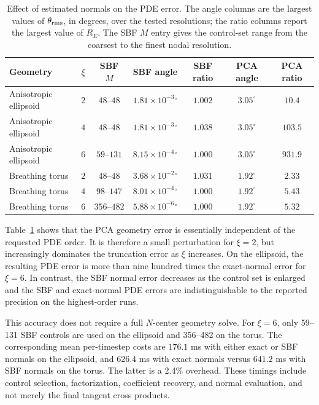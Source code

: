 \documentclass[a4paper,fleqn]{cas-sc}
\begin{document}
\begin{table}[!htbp]
\centering
\caption{Effect of estimated normals on the PDE error.  The angle columns are
the largest values of \(\theta_{\rm rms}\), in degrees, over the tested
resolutions; the ratio columns report the largest value of \(R_E\).  The SBF
\(M\) entry gives the control-set range from the coarsest to the finest nodal
resolution.}
\scriptsize
\setlength{\tabcolsep}{3pt}
\label{tab:final-normal-source-accuracy}
\begin{tabular}{l c c c c c c}
\toprule
Geometry & \(\xi\) & SBF \(M\) & SBF angle &
SBF ratio & PCA angle & PCA ratio \\
\midrule
Anisotropic ellipsoid & \(2\) & \(48\text{--}48\) &
\(1.81{\times}10^{-3}{}^\circ\) & \(1.002\) & \(3.05^\circ\) & \(10.4\) \\
Anisotropic ellipsoid & \(4\) & \(48\text{--}48\) &
\(1.81{\times}10^{-3}{}^\circ\) & \(1.038\) & \(3.05^\circ\) & \(103.5\) \\
Anisotropic ellipsoid & \(6\) & \(59\text{--}131\) &
\(8.15{\times}10^{-4}{}^\circ\) & \(1.000\) & \(3.05^\circ\) & \(931.9\) \\
Breathing torus & \(2\) & \(48\text{--}48\) &
\(3.68{\times}10^{-2}{}^\circ\) & \(1.031\) & \(1.92^\circ\) & \(2.33\) \\
Breathing torus & \(4\) & \(98\text{--}147\) &
\(8.01{\times}10^{-4}{}^\circ\) & \(1.000\) & \(1.92^\circ\) & \(5.43\) \\
Breathing torus & \(6\) & \(356\text{--}482\) &
\(5.88{\times}10^{-6}{}^\circ\) & \(1.000\) & \(1.92^\circ\) & \(5.32\) \\
\bottomrule
\end{tabular}
\end{table}

Table~\ref{tab:final-normal-source-accuracy} shows that the PCA geometry error
is essentially independent of the requested PDE order.  It is therefore a
small perturbation for \(\xi=2\), but increasingly dominates the truncation
error as \(\xi\) increases.  On the ellipsoid, the resulting PDE error is more
than nine hundred times the exact-normal error for \(\xi=6\).  In contrast,
the SBF normal error decreases as the control set is enlarged and the SBF and
exact-normal PDE errors are indistinguishable to the reported precision on the
highest-order runs.

This accuracy does not require a full \(N\)-center geometry solve.  For
\(\xi=6\), only 59--131 SBF controls are used on the ellipsoid and 356--482 on
the torus.  The corresponding mean per-timestep costs are \(176.1\) ms with
either exact or SBF normals on the ellipsoid, and \(626.4\) ms with exact
normals versus \(641.2\) ms with SBF normals on the torus.  The latter is a
2.4\% overhead.  These timings include control selection, factorization,
coefficient recovery, and normal evaluation, and not merely the final tangent
cross products.
\end{document}
